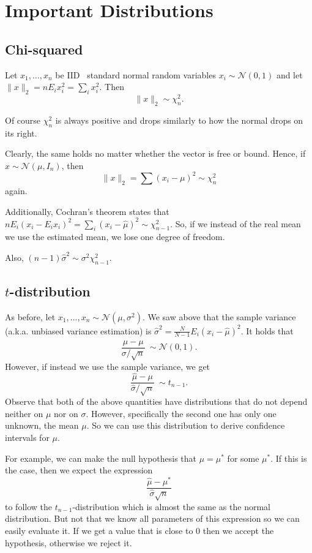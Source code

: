 \documentclass[11pt]{article}
\theoremstyle{definition}
\newcommand{\IID}{\textsf{IID}}
\newcommand{\Normal}[2]{\ensuremath{\mathcal N (#1, #2)}}
\begin{document}
\section{Important Distributions}

\subsection{Chi-squared}
Let $x_1,\ldots,x_n$ be \IID~ standard normal random variables
$x_i\sim\mathcal{N}(0,1)$ and let $\|x\|_2=nE_ix_i^2=\sum_i x_i^2$. Then
$$\|x\|_2\sim\chi_n^2.$$

Of course $\chi_n^2$ is always positive and drops similarly to how the normal
drops on its right.

Clearly, the same holds no matter whether the vector is free or bound. Hence, if
$x\sim\mathcal{N}(\mu,I_n)$, then $$\|x\|_2=\sum(x_i-\mu)^2\sim\chi_n^2$$ again.

Additionally, Cochran's theorem states that
$nE_i(x_i-E_ix_i)^2=\sum_i(x_i-\hat\mu)^2\sim\chi_{n-1}^2$. So, if we instead of
the real mean we use the estimated mean, we lose one degree of freedom.

Also, $(n-1)\hat\sigma^2\sim \sigma^2\chi_{n-1}^2$.

\subsection{$t$-distribution}
As before, let $x_1,\ldots,x_n\sim\Normal\mu{\sigma^2}$. We saw above that the
sample variance (a.k.a. unbiased variance estimation) is
$\hat\sigma^2=\frac{N}{N-1}E_i(x_i-\hat\mu)^2$. It holds that
\begin{equation}
	\frac{\hat\mu-\mu}{\sigma/\sqrt n}~\sim\Normal{0}{1}.
\end{equation}
However, if instead we use the sample variance, we get
\begin{equation}
	\frac{\hat\mu-\mu}{\hat\sigma/\sqrt n}~\sim t_{n-1}.
\end{equation}
Observe that both of the above quantities have distributions that do not depend
neither on $\mu$ nor on $\sigma$. However, specifically the second one has only
one unknown, the mean $\mu$. So we can use this distribution to derive
confidence intervals for $\mu$.

For example, we can make the null hypothesis that $\mu=\mu^*$ for some $\mu^*$.
If this is the case, then we expect the expression
\[\frac{\hat\mu-\mu^*}{\hat\sigma\sqrt{n}}\] to follow the
$t_{n-1}$-distribution which is almost the same as the normal distribution. But
not that we know all parameters of this expression so we can easily evaluate it.
If we get a value that is close to 0 then we accept the hypothesis, otherwise we
reject it.
\end{document}
